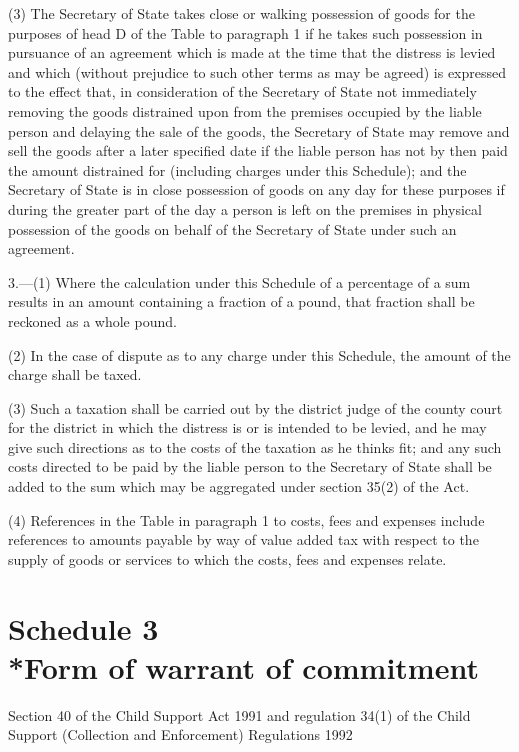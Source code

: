 \documentclass[12pt,a4paper]{article}
\begin{document}
(3) The Secretary of State takes close or walking possession of goods for the purposes of head D of the Table to paragraph 1 if he takes such possession in pursuance of an agreement which is made at the time that the distress is levied and which (without prejudice to such other terms as may be agreed) is expressed to the effect that, in consideration of the Secretary of State not immediately removing the goods distrained upon from the premises occupied by the liable person and delaying the sale of the goods, the Secretary of State may remove and sell the goods after a later specified date if the liable person has not by then paid the amount distrained for (including charges under this Schedule); and the Secretary of State is in close possession of goods on any day for these purposes if during the greater part of the day a person is left on the premises in physical possession of the goods on behalf of the Secretary of State under such an agreement.

\medskip

3.—(1) Where the calculation under this Schedule of a percentage of a sum results in an amount containing a fraction of a pound, that fraction shall be reckoned as a whole pound.

(2) In the case of dispute as to any charge under this Schedule, the amount of the charge shall be taxed.

(3) Such a taxation shall be carried out by the district judge of the county court for the district in which the distress is or is intended to be levied, and he may give such directions as to the costs of the taxation as he thinks fit; and any such costs directed to be paid by the liable person to the Secretary of State shall be added to the sum which may be aggregated under section 35(2) of the Act.

(4) References in the Table in paragraph 1 to costs, fees and expenses include references to amounts payable by way of value added tax with respect to the supply of goods or services to which the costs, fees and expenses relate.

\part[Schedule 3 --- Form of warrant of commitment]{Schedule 3\\*Form of warrant of commitment}

\renewcommand\parthead{--- Schedule 3}

\noindent
Section 40 of the Child Support Act 1991 and regulation 34(1) of the Child Support (Collection and Enforcement) Regulations 1992
\end{document}
